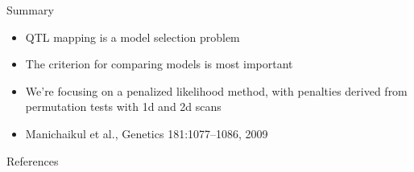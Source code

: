 \documentclass[12pt]{article}
\newcommand{\headsize}{\fontsize{35}{35} \selectfont}
\newcommand{\smallersize}{\fontsize{20}{25} \selectfont}
\newcommand{\smallestsize}{\fontsize{18}{22} \selectfont}
\begin{document}
%
%
%
%
%





\newpage

\headsize \color{myyellow}
\hfill \begin{minipage}{5.75in}
\centering
Summary
\end{minipage}

\vspace{3cm} \color{mywhite} \smallersize

\hfill \begin{minipage}{9.5in}

\begin{itemize}
\itemsep24pt
\item QTL mapping is a model selection problem
\item The criterion for comparing models is most important
\item We're focusing on a penalized likelihood method, with penalties
  derived from permutation tests with 1d and 2d scans
\item Manichaikul et al., Genetics 181:1077--1086, 2009
\end{itemize}

\end{minipage} \hspace{0.5in}





\newpage

\headsize \color{myyellow}
\hfill \begin{minipage}{5.75in}
\centering
References
\end{minipage}

\vspace{15mm}

\color{mywhite} \smallestsize
\end{document}
